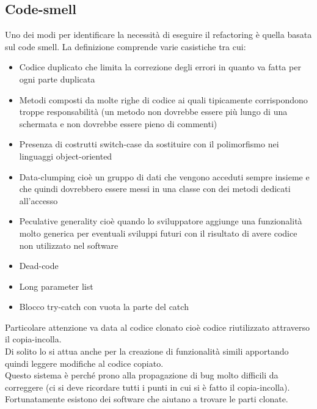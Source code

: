 \subsection{Code-smell}
Uno dei modi per identificare la necessità di eseguire il refactoring è quella basata sul code smell.
La definizione comprende varie casistiche tra cui:
\begin{itemize}[noitemsep]
    \item Codice duplicato che limita la correzione degli errori in quanto va fatta per ogni parte duplicata
    \item Metodi composti da molte righe di codice ai quali tipicamente corrispondono troppe responsabilità (un metodo non dovrebbe essere più lungo di una schermata e non dovrebbe essere pieno di commenti)
    \item Presenza di costrutti switch-case da sostituire con il polimorfismo nei linguaggi object-oriented
    \item Data-clumping cioè un gruppo di dati che vengono acceduti sempre insieme e che quindi dovrebbero essere messi in una classe con dei metodi dedicati all'accesso
    \item Peculative generality cioè quando lo sviluppatore aggiunge una funzionalità molto generica per eventuali sviluppi futuri con il risultato di avere codice non utilizzato nel software
    \item Dead-code
    \item Long parameter list
    \item Blocco try-catch con vuota la parte del catch
\end{itemize}
Particolare attenzione va data al codice clonato cioè codice riutilizzato attraverso il copia-incolla.\\
Di solito lo si attua anche per la creazione di funzionalità simili apportando quindi leggere modifiche al codice copiato.\\
Questo sistema è perché prono alla propagazione di bug molto difficili da correggere (ci si deve ricordare tutti i punti in cui si è fatto il copia-incolla).
Fortunatamente esistono dei software che aiutano a trovare le parti clonate.\\

